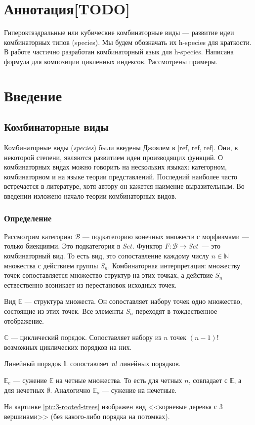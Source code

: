 \section{Аннотация[TODO]}
Гипероктаэдральные или кубические комбинаторные виды --- развитие идеи
комбинаторных типов (species). Мы будем обозначать их h-species для
краткости.
В работе частично разработан комбинаторный язык для h-species.
Написана формула для композиции цикленных индексов. Рассмотрены примеры.

\section{Введение}

\subsection{Комбинаторные виды}
Комбинаторные виды (\emph{species}) были введены Джоялем в [ref, ref, ref].
Они, в некоторой степени, являются развитием идеи производящих функций.
О комбинаторных видах можно говорить на нескольких языках: категорном,
комбинаторном и на языке теории представлений. Последний наиболее часто
встречается в литературе, хотя автору он кажется наимение выразительным.
Во введении изложено начало теории комбинаторных видов.
\subsubsection{Определение}
Рассмотрим категорию $\mathcal B$ --- подкатегорию конечных множеств с
морфизмами --- только биекциями. Это подкатегория в $Set$. Функтор
$F:\mathcal B \rightarrow Set$~--- это комбинаторный вид. То есть вид, это
сопоставление каждому числу $n \in \mathbb N$ множества с действием группы
$S_n$. Комбинаторная интерпретация: множеству точек сопоставляется
множество структур на этих точках, а действие $S_n$ ествественно возникает из
перестановок исходных точек. 
\begin{example}
Вид $\mathbb E$ --- структура множеста. Он
сопоставляет набору точек одно множество, состоящие из этих точек. Все элементы $S_n$
переходят в тождественное отображение. 
\end{example}
\begin{example}
$\mathbb C$ --- циклический порядок. Сопоставляет набору из $n$ точек $(n-1)!$
возможных циклических порядков на них. 
\end{example}
\begin{example}
Линейный порядок $\mathbb L$ сопоставляет $n!$ линейных
порядков. 
\end{example}
\begin{example}
$\mathbb E_e$ --- сужение $\mathbb E$ на четные множества. То есть для четных
$n$, совпадает с $\mathbb E$, а для нечетных $\emptyset$. Аналогично $\mathbb
E_o$ --- сужение на нечетные.
\end{example}
\begin{example}
На картинке \ref{pic:3-rooted-trees} изображен вид <<корневые
деревья с 3 вершинами>> (без какого-либо порядка на потомках).
\end{example}

